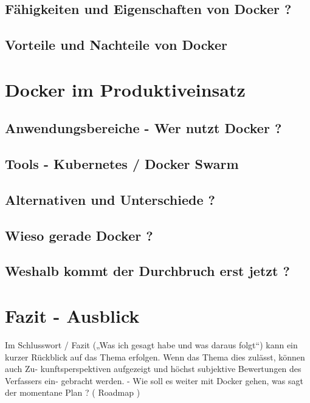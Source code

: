 \documentclass[12pt,toc=bib,toc=listof]{scrreprt}
\begin{document}
\section{Fähigkeiten und Eigenschaften von Docker ?}

\section{Vorteile und Nachteile von Docker}


\chapter{Docker im Produktiveinsatz}

\section{Anwendungsbereiche - Wer nutzt Docker ?}

\section{Tools - Kubernetes / Docker Swarm}


\section{Alternativen und Unterschiede ?}

\section{Wieso gerade Docker ?}

\section{Weshalb kommt der Durchbruch erst jetzt ?}

\chapter{Fazit - Ausblick} %
\label{sec:fazit}
Im Schlusswort / Fazit („Was ich gesagt habe und was daraus folgt“) kann ein kurzer
Rückblick auf das Thema erfolgen. Wenn das Thema dies zulässt, können auch Zu-
kunftsperspektiven aufgezeigt und höchst subjektive Bewertungen des Verfassers ein-
gebracht werden.
- Wie soll es weiter mit Docker gehen, was sagt der momentane Plan ? ( Roadmap )
\end{document}
